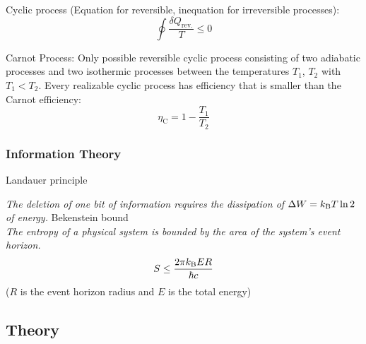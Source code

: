 			\noindent
			Cyclic process (Equation for reversible, inequation for irreversible processes):
			\begin{equation}
				\oint \frac{\delta Q_\text{rev.}}{T} \le 0
			\end{equation}

			\noindent
			Carnot Process:
			Only possible reversible cyclic process consisting of two adiabatic processes and two isothermic processes between the temperatures $T_1$, $T_2$ with $T_1 < T_2$. Every realizable cyclic process has efficiency that is smaller than the Carnot efficiency:
			\begin{equation}
				\eta_\text{C} = 1-\frac{T_1}{T_2}
			\end{equation}

		\subsubsection{Information Theory}
			Landauer principle
			
			\indent \emph{The deletion of one bit of information requires the dissipation of $\Delta W = k_{\text{B}} T \ln 2$ of energy.}\nl
			\noindent
			Bekenstein bound \\
			\indent \emph{The entropy of a physical system is bounded by the area of the system's event horizon.}
			\begin{equation}
				S \le \frac{2\pi k_{\text{B}} E R}{\hbar c}
			\end{equation}
			($R$ is the event horizon radius and $E$ is the total energy)

	\subsection{Theory}
